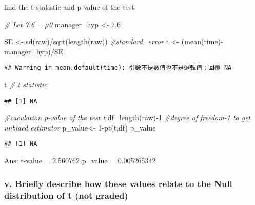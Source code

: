 \documentclass[
]{article}
\newenvironment{Shaded}{\begin{snugshade}}{\end{snugshade}}
\newcommand{\CommentTok}[1]{\textcolor[rgb]{0.56,0.35,0.01}{\textit{#1}}}
\newcommand{\DecValTok}[1]{\textcolor[rgb]{0.00,0.00,0.81}{#1}}
\newcommand{\FloatTok}[1]{\textcolor[rgb]{0.00,0.00,0.81}{#1}}
\newcommand{\FunctionTok}[1]{\textcolor[rgb]{0.00,0.00,0.00}{#1}}
\newcommand{\NormalTok}[1]{#1}
\newcommand{\OtherTok}[1]{\textcolor[rgb]{0.56,0.35,0.01}{#1}}
\newcommand{\SpecialCharTok}[1]{\textcolor[rgb]{0.00,0.00,0.00}{#1}}
\begin{document}
find the t-statistic and p-value of the test

\begin{Shaded}
\begin{Highlighting}[]
\CommentTok{\# Let 7.6 = μ0}
\NormalTok{manager\_hyp }\OtherTok{\textless{}{-}} \FloatTok{7.6}

\NormalTok{SE }\OtherTok{\textless{}{-}} \FunctionTok{sd}\NormalTok{(raw)}\SpecialCharTok{/}\FunctionTok{sqrt}\NormalTok{(}\FunctionTok{length}\NormalTok{(raw)) }\CommentTok{\#standard\_error}
\NormalTok{t  }\OtherTok{\textless{}{-}}\NormalTok{ (}\FunctionTok{mean}\NormalTok{(time)}\SpecialCharTok{{-}}\NormalTok{manager\_hyp)}\SpecialCharTok{/}\NormalTok{SE}
\end{Highlighting}
\end{Shaded}

\begin{verbatim}
## Warning in mean.default(time): 引數不是數值也不是邏輯值：回覆 NA
\end{verbatim}

\begin{Shaded}
\begin{Highlighting}[]
\NormalTok{t }\CommentTok{\# t statistic}
\end{Highlighting}
\end{Shaded}

\begin{verbatim}
## [1] NA
\end{verbatim}

\begin{Shaded}
\begin{Highlighting}[]
\CommentTok{\#caculation p{-}value of the test t}
\NormalTok{df}\OtherTok{=}\FunctionTok{length}\NormalTok{(raw)}\SpecialCharTok{{-}}\DecValTok{1} \CommentTok{\#degree of freedom{-}1 to get unbiaed estimator}
\NormalTok{p\_value}\OtherTok{\textless{}{-}} \DecValTok{1}\SpecialCharTok{{-}}\FunctionTok{pt}\NormalTok{(t,df)}
\NormalTok{p\_value}
\end{Highlighting}
\end{Shaded}

\begin{verbatim}
## [1] NA
\end{verbatim}

Ans: t-value = 2.560762 p\_value = 0.005265342

\hypertarget{v.-briefly-describe-how-these-values-relate-to-the-null-distribution-of-t-not-graded}{%
\subsubsection{v. Briefly describe how these values relate to the Null
distribution of t (not
graded)}\label{v.-briefly-describe-how-these-values-relate-to-the-null-distribution-of-t-not-graded}}
\end{document}
